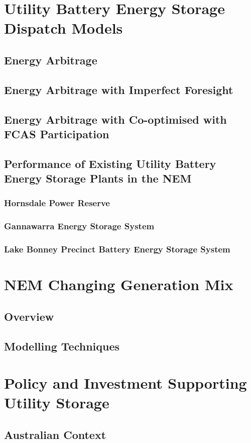 \section{ Utility Battery Energy Storage Dispatch Models }
\subsection{ Energy Arbitrage }
\subsection{ Energy Arbitrage with Imperfect Foresight }
\subsection{ Energy Arbitrage with Co-optimised with FCAS Participation }
\subsection{ Performance of Existing Utility Battery Energy Storage Plants in the NEM }
\subsubsection{ Hornsdale Power Reserve }
\subsubsection{ Gannawarra Energy Storage System }
\subsubsection{ Lake Bonney Precinct Battery Energy Storage System }
\section{ NEM Changing Generation Mix  }
\subsection{ Overview }
\subsection{ Modelling Techniques }
\section{ Policy and Investment Supporting Utility Storage   }
\subsection{ Australian Context }
